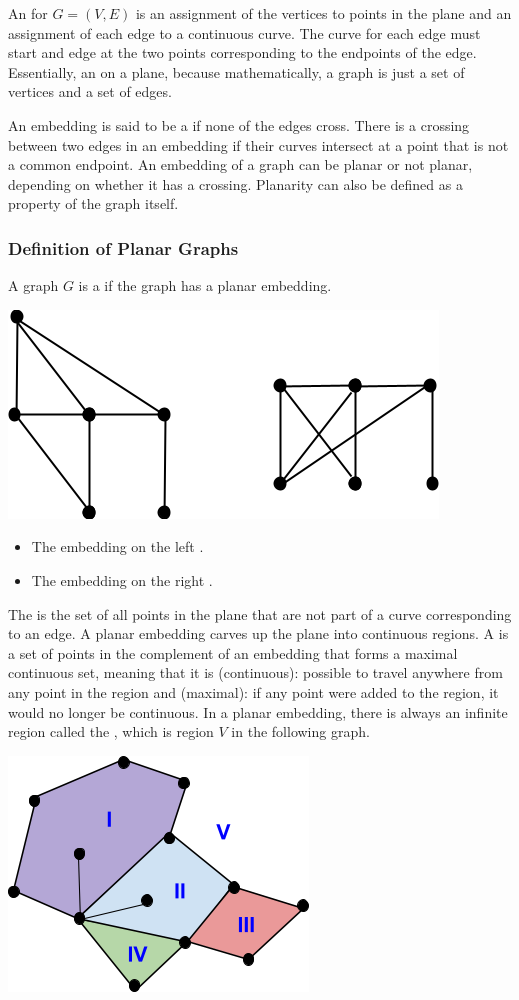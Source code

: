 An  for $G = (V,E)$ is an assignment of the vertices to points in the plane and an assignment of each edge to a continuous curve. The curve for each edge must start and edge at the two points corresponding to the endpoints of the edge. Essentially, an  on a plane, because mathematically, a graph is just a set of vertices and a set of edges.

An embedding is said to be a  if none of the edges cross. There is a crossing between two edges in an embedding if their curves intersect at a point that is not a common endpoint. An embedding of a graph can be planar or not planar, depending on whether it has a crossing. Planarity can also be defined as a property of the graph itself.

\subsubsection*{Definition of Planar Graphs}
A graph $G$ is a  if the graph has a planar embedding.

\begin{center}
  \includegraphics[width=0.4\linewidth]{resources/two embeddings.png}
\end{center}
\begin{itemize}
  \item The embedding on the left .
  \item The embedding on the right .
\end{itemize}

The  is the set of all points in the plane that are not part of a curve corresponding to an edge. A planar embedding carves up the plane into continuous regions. A  is a set of points in the complement of an embedding that forms a maximal continuous set, meaning that it is (continuous): possible to travel anywhere from any point in the region and (maximal): if any point were added to the region, it would no longer be continuous. In a planar embedding, there is always an infinite region called the , which is region $V$ in the following graph.
\begin{center}
  \includegraphics[width=0.4\linewidth]{resources/regions of a planar embedding.png}
\end{center}

